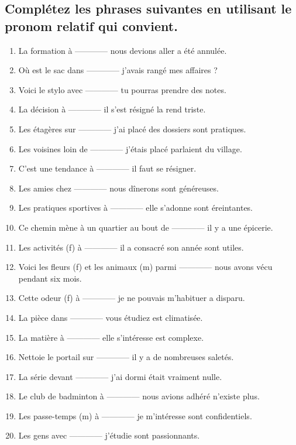 \documentclass[12pt]{article}
\begin{document}
\subsection{Complétez les phrases suivantes en utilisant le pronom relatif qui convient.} 
\begin{enumerate}
\item La formation à ------------ nous devions aller a été annulée. \item Où est le sac dans ------------ j’avais rangé mes affaires ? \item Voici le stylo avec ------------ tu pourras prendre des notes. \item La décision à ------------ il s’est résigné la rend triste.
\item Les étagères sur ------------ j’ai placé des dossiers sont pratiques. \item Les voisines loin de ------------ j’étais placé parlaient du village. \item C’est une tendance à ------------ il faut se résigner. \item Les amies chez ------------ nous dînerons sont généreuses. \item Les pratiques sportives à ------------ elle s’adonne sont éreintantes. \item Ce chemin mène à un quartier au bout de ------------ il y a une épicerie. \item Les activités (f) à ------------ il a consacré son année sont utiles. \item Voici les fleurs (f) et les animaux (m) parmi ------------ nous avons vécu pendant six mois. \item Cette odeur (f) à ------------ je ne pouvais m’habituer a disparu. \item La pièce dans ------------ vous étudiez est climatisée. \item La matière à ------------ elle s’intéresse est complexe. \item Nettoie le portail sur ------------ il y a de nombreuses saletés. \item La série devant ------------ j’ai dormi était vraiment nulle. \item Le club de badminton à ------------ nous avions adhéré n’existe plus. \item Les passe-temps (m) à ------------ je m’intéresse sont confidentiels. \item Les gens avec ------------ j’étudie sont passionnants.
\end{enumerate}
\end{document}
